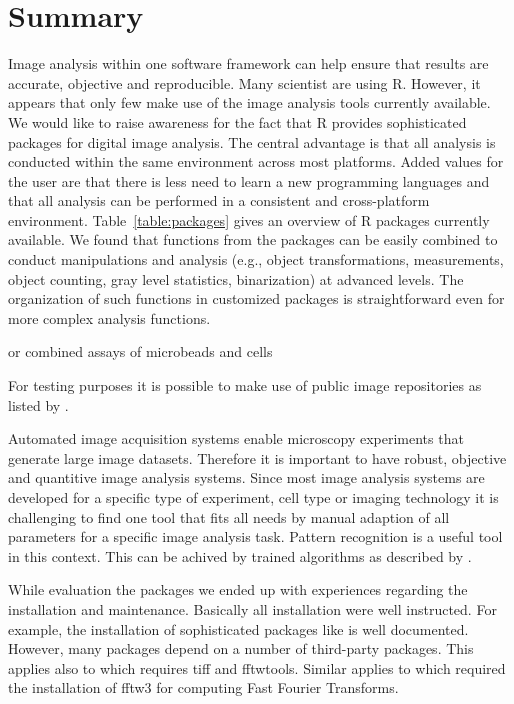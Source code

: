 \section{Summary}

Image analysis within one software framework can help ensure that results are 
accurate, objective and reproducible. Many scientist are using R. However, it 
appears that only few make use of the image analysis tools currently available. 
We would like to raise awareness for the fact that R provides sophisticated 
packages for digital image analysis. The central advantage is that all analysis 
is conducted within the same environment across most  platforms. Added values 
for the user are that there is less need to learn a new programming languages 
and that all analysis can be performed in a consistent and cross-platform 
environment. Table~\ref{table:packages} gives an overview of R packages 
currently available. We found that functions from the packages can be easily 
combined to conduct manipulations and analysis (e.g., object transformations, 
measurements, object counting, gray level statistics, binarization) at advanced 
levels. The organization of such functions in customized packages is 
straightforward even for more complex analysis functions.

\citep{rodiger_intestinal_2015} or combined assays of microbeads and cells 
\citep{grossmann_simultaneous_2016, scholz_second_2015}

For testing purposes it is possible to make use of public image repositories as 
listed by \citet{eliceiri_biological_2012}.

Automated image acquisition systems enable microscopy experiments that generate 
large image datasets. Therefore it is important to have robust, objective and 
quantitive image analysis systems. Since most image analysis systems are 
developed for a specific type of experiment, cell type or imaging technology it 
is challenging to find one tool that fits all needs by manual adaption of all 
parameters for a specific image analysis task. Pattern recognition is a useful 
tool in this context. This can be achived by trained algorithms as described by 
\citet{shamir_pattern_2010}. 

While evaluation the packages we ended up with experiences regarding the 
installation and maintenance. Basically all installation were well instructed. 
For example, the installation of sophisticated packages like  
is 
well documented. However, many packages depend on a number of third-party 
packages. This applies also to  which requires tiff and 
fftwtools. Similar applies to  which required the installation 
of fftw3 for computing Fast Fourier Transforms.

